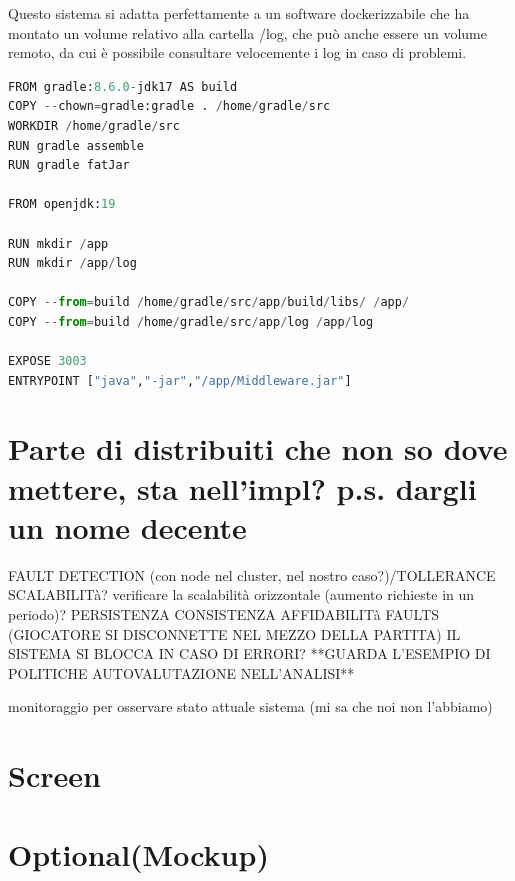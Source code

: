 Questo sistema si adatta perfettamente a un software dockerizzabile che ha montato un volume relativo alla cartella /log, che può anche essere un volume remoto, da cui è possibile consultare velocemente i log in caso di problemi.

\begin{lstlisting}[language=Python, caption={Volume di log nel dockerfile l.13 da montare successivamente}, label=list:dockerfile_log]
FROM gradle:8.6.0-jdk17 AS build
COPY --chown=gradle:gradle . /home/gradle/src
WORKDIR /home/gradle/src
RUN gradle assemble
RUN gradle fatJar 

FROM openjdk:19

RUN mkdir /app
RUN mkdir /app/log

COPY --from=build /home/gradle/src/app/build/libs/ /app/
COPY --from=build /home/gradle/src/app/log /app/log

EXPOSE 3003
ENTRYPOINT ["java","-jar","/app/Middleware.jar"]
\end{lstlisting}

\section{Parte di distribuiti che non so dove mettere, sta nell'impl? p.s. dargli un nome decente}
FAULT DETECTION (con node nel cluster, nel nostro caso?)/TOLLERANCE
SCALABILITà?
verificare la scalabilità orizzontale (aumento richieste in un periodo)?
PERSISTENZA
CONSISTENZA
AFFIDABILITà
FAULTS (GIOCATORE SI DISCONNETTE NEL MEZZO DELLA PARTITA)
IL SISTEMA SI BLOCCA IN CASO DI ERRORI?
**GUARDA L'ESEMPIO DI POLITICHE AUTOVALUTAZIONE NELL'ANALISI**

monitoraggio per osservare stato attuale sistema (mi sa che noi non l'abbiamo)
\section{Screen}
\section{Optional(Mockup)}

